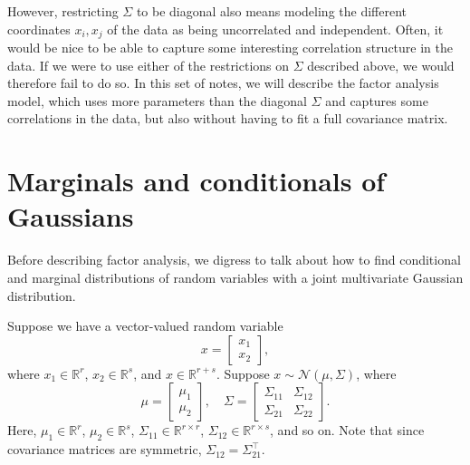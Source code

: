 However, restricting $\Sigma$ to be diagonal also means modeling the different
coordinates $x_i, x_j$ of the data as being uncorrelated and independent. Often,
it would be nice to be able to capture some interesting correlation structure
in the data. If we were to use either of the restrictions on $\Sigma$ described above,
we would therefore fail to do so. In this set of notes, we will describe the
factor analysis model, which uses more parameters than the diagonal $\Sigma$ and
captures some correlations in the data, but also without having to fit a full
covariance matrix.

\section{Marginals and conditionals of Gaussians}
Before describing factor analysis, we digress to talk about how to find conditional and marginal distributions of random variables with a joint multivariate Gaussian distribution.

Suppose we have a vector-valued random variable
\[
x =
\begin{bmatrix}
    x_1\\
    x_2
\end{bmatrix},
\]
where $x_1 \in \mathbb R^r$, $x_2 \in \mathbb R^s$, and $x \in \mathbb R^{r+s}$.
Suppose $x \sim \mathcal N(\mu , \Sigma)$, where
\[
    \mu = \begin{bmatrix}
        \mu_1\\
        \mu_2        
    \end{bmatrix}
    ,
    \quad
    \Sigma = \begin{bmatrix}
        \Sigma_{11} & \Sigma_{12}\\
        \Sigma_{21} & \Sigma_{22}        
    \end{bmatrix}.
\]
Here, $\mu_1 \in \mathbb R^r$, $\mu_2 \in \mathbb R^s$, $\Sigma_{11} \in \mathbb R^{r \times r}$,
$\Sigma_{12} \in \mathbb R^{r \times s}$, and so on. Note that since
covariance matrices are symmetric, $\Sigma_{12} = \Sigma^\top_{21}$.

